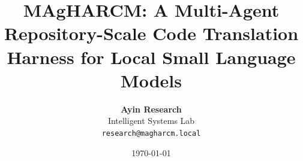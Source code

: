 \documentclass[10pt,twocolumn]{article}
\title{\LARGE\textbf{MAgHARCM: A Multi-Agent Repository-Scale Code Translation Harness for Local Small Language Models}}
\author{
  \textbf{Ayin Research}\\
  \normalsize Intelligent Systems Lab\\
  \texttt{research@magharcm.local}
}
\date{\today}
\begin{document}
\maketitle

\begin{abstract}

\end{abstract}









\end{document}
